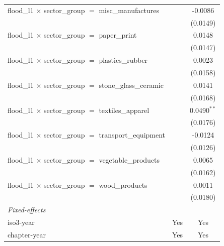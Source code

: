 \begin{tabular}{lcc}
   flood\_l1 $\times$ sector\_group $=$ misc\_manufactures         &                       & -0.0086\\   
                                                                   &                       & (0.0149)\\   
   flood\_l1 $\times$ sector\_group $=$ paper\_print               &                       & 0.0148\\   
                                                                   &                       & (0.0147)\\   
   flood\_l1 $\times$ sector\_group $=$ plastics\_rubber           &                       & 0.0023\\   
                                                                   &                       & (0.0158)\\   
   flood\_l1 $\times$ sector\_group $=$ stone\_glass\_ceramic      &                       & 0.0141\\   
                                                                   &                       & (0.0168)\\   
   flood\_l1 $\times$ sector\_group $=$ textiles\_apparel          &                       & 0.0490$^{**}$\\   
                                                                   &                       & (0.0176)\\   
   flood\_l1 $\times$ sector\_group $=$ transport\_equipment       &                       & -0.0124\\   
                                                                   &                       & (0.0126)\\   
   flood\_l1 $\times$ sector\_group $=$ vegetable\_products        &                       & 0.0065\\   
                                                                   &                       & (0.0162)\\   
   flood\_l1 $\times$ sector\_group $=$ wood\_products             &                       & 0.0011\\   
                                                                   &                       & (0.0180)\\   
   \midrule
   \emph{Fixed-effects}\\
   iso3-year                                                       & Yes                   & Yes\\  
   chapter-year                                                    & Yes                   & Yes\\  

\end{tabular}
